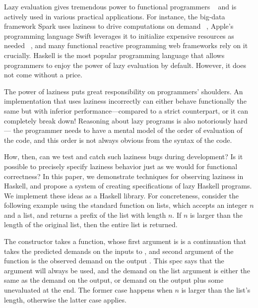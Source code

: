 \documentclass[acmsmall,review]{acmart}\settopmatter{}
\begin{document}
Lazy evaluation gives tremendous power to functional programmers
~\cite{WhyFPMatters} and is actively used in various practical
applications. For instance, the big-data framework Spark uses laziness
to drive computations on demand
~\cite{Zaharia:2012:RDD:2228298.2228301}, Apple's programming language
Swift leverages it to initialize expensive resources as needed
~\cite{Swift}, and many functional reactive programming web frameworks
rely on it crucially\cn {}. Haskell is the most popular programming language that
allows programmers to enjoy the power of lazy evaluation by
default. However, it does not come without a price.

The power of laziness puts great responsibility on programmers'
shoulders. An implementation that uses laziness incorrectly can either
behave functionally the same but with inferior  performance---compared to a strict counterpart, or it can
completely break down! Reasoning about lazy
programs is also notoriously hard --- the programmer needs to have a
mental model of the order of evaluation of the code, and this order is
not always obvious from the syntax of the code.

How, then, can we test and catch such laziness bugs during
development? Is it possible to precisely specify laziness behavior
just as we would for functional correctness?
%
In this paper, we demonstrate techniques for observing laziness in
Haskell, and propose a system of creating specifications of lazy
Haskell programs. We implement these ideas as a Haskell library. For
concreteness, consider the following example using the standard
 function on lists, which accepts an integer $n$ and a list, and returns
a prefix of the list with length $n$. If $n$ is larger than the length
of the original list, then the entire list is returned.
%
%
The  constructor takes a function, whose first
argument  is is a continuation that takes the predicted
demands on the inputs to , and second argument of the
function is the observed demand on the output \lk{[a]}. This spec says
that the  argument will always be used, and the demand on the
list argument is either the same as the demand on the output, or
demand on the output plus some unevaluated  at the end. The
former case happens when $n$ is larger than the list's length,
otherwise the latter case applies.
\end{document}

